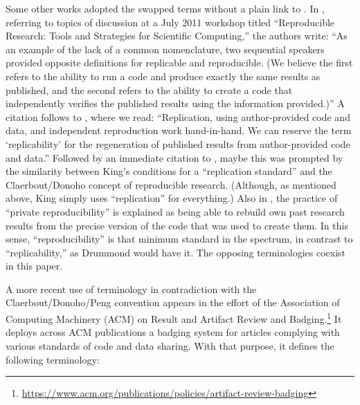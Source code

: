 \documentclass{statement}
\begin{document}
Some other works adopted the swapped terms without a plain link to \cite{drummond2009}. 
In \cite{levequeETal2012}, referring to topics of discussion at a July 2011 workshop titled ``Reproducible Research: Tools and Strategies for Scientific Computing,'' the authors write: ``As an example of the lack of a common nomenclature, two sequential speakers provided opposite definitions for replicable and reproducible. (We believe the  first refers to the ability to run a code and produce exactly the same results as published, and the second refers to the ability to create a code that independently verifies the published results using the information provided.)'' 
A citation follows to \cite{stodden2011}, where we read: ``Replication, using author-provided code and data, and independent reproduction work hand-in-hand. We can reserve the term `replicability' for the regeneration of published results from author-provided code and data.'' Followed by an immediate citation to \cite{king1995}, maybe this was prompted by the similarity between King's conditions for a ``replication standard'' and the Claerbout/Donoho concept of reproducible research. 
(Although, as mentioned above, King simply uses ``replication'' for everything.) 
Also in \cite{levequeETal2012}, the practice of ``private reproducibility'' is explained as being able to rebuild own past research results from the precise version of the code that was used to create them. 
In this sense, ``reproducibility'' is that minimum standard in the spectrum, in contrast to ``replicability,'' as Drummond would have it. 
The opposing terminologies coexist in this paper.

A more recent use of terminology in contradiction with the Claerbout/Donoho/Peng convention appears in the effort of the Association of Computing Machinery (ACM) on Result and Artifact Review and Badging.\footnote{ \url{https://www.acm.org/publications/policies/artifact-review-badging}}  It deploys across ACM publications a badging system for articles complying with various standards of code and data sharing. With that purpose, it defines the following terminology:
\end{document}
